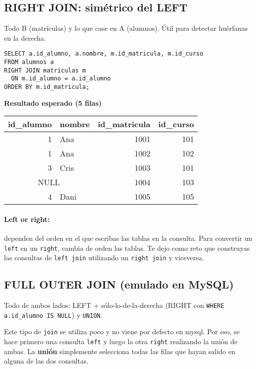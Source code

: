 \documentclass[11pt,a4paper]{article}
\begin{document}
\subsection{RIGHT JOIN: simétrico del LEFT}
\begin{tcolorbox}[title=Idea]
Todo B (matrículas) y lo que case en A (alumnos). Útil para detectar huérfanas en la derecha.
\end{tcolorbox}

\begin{lstlisting}
SELECT a.id_alumno, a.nombre, m.id_matricula, m.id_curso
FROM alumnos a
RIGHT JOIN matriculas m
  ON m.id_alumno = a.id_alumno
ORDER BY m.id_matricula;
\end{lstlisting}

\textbf{Resultado esperado (5 filas)}
\begin{center}
\begin{tabular}{r l r r}
\toprule
id\_alumno & nombre & id\_matricula & id\_curso \\
\midrule
1   & Ana  & 1001 & 101 \\
1   & Ana  & 1002 & 102 \\
3   & Cris & 1003 & 101 \\
\multicolumn{2}{c}{NULL} & 1004 & 103 \\
4   & Dani & 1005 & 105 \\
\bottomrule
\end{tabular}
\end{center}

\paragraph{Left or right:} dependen del orden en el que escribas las tablas en la consulta. Para convertir un \texttt{left} en un \texttt{right}, cambia de orden las tablas.
%
Te dejo como reto que construyas las consultas de \texttt{left join} utilizando un \texttt{right join} y viceversa.

\subsection{FULL OUTER JOIN (emulado en MySQL)}
\begin{tcolorbox}[title=Idea]
Todo de ambos lados: LEFT +
sólo-lo-de-la-derecha (RIGHT con \texttt{WHERE a.id\_alumno IS NULL}) y \texttt{UNION}.
\end{tcolorbox}

Este tipo de \texttt{join} se utiliza poco y no viene por defecto en mysql. Por eso, se hace primero una consulta \texttt{left} y luego la otra \texttt{right} realizando la unión de ambas. 
%
La \textbf{unión} simplemente selecciona todas las filas que hayan salido en alguna de las dos consultas.
\end{document}
